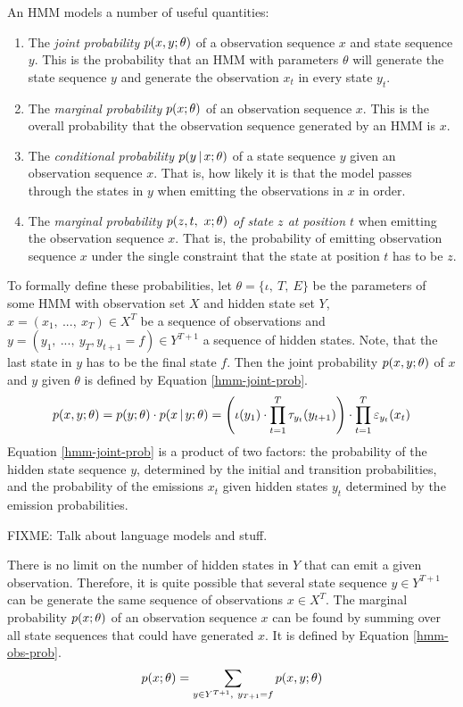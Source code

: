 An HMM models a number of useful quantities:
\begin{enumerate}
\item The {\it joint probability} $p(x,y\mbox{$ ; \, $}\theta)$ of a observation
  sequence $x$ and state sequence $y$. This is the probability that an
  HMM with parameters $\theta$ will generate the state sequence $y$
  and generate the observation $x_t$ in every state $y_t$.
\item The {\it marginal probability} $p(x\mbox{$ ; \, $} \theta)$ of an
  observation sequence $x$. This is the overall probability that the
  observation sequence generated by an HMM is $x$.
\item The {\it conditional probability} $p(y\mbox{$ \, | \, $} x\mbox{$ ; \, $}\theta)$ of a
  state sequence $y$ given an observation sequence $x$. That is, how
  likely it is that the model passes through the states in $y$ when
  emitting the observations in $x$ in order.
\item The {\it marginal probability $p(z, t,\ x\mbox{$ ; \, $} \theta)$ of
    state $z$ at position $t$} when emitting the observation sequence
  $x$. That is, the probability of emitting observation sequence $x$
  under the single constraint that the state at position $t$ has to be $z$.
\end{enumerate}

To formally define these probabilities, let $\theta = \{\iota,\ T,\
E\}$ be the parameters of some HMM with observation set $X$ and hidden
state set $Y$, $x = (x_1,\ ...,\ x_T) \in X^T$ be a sequence of
observations and $y = (y_1,\ ...,\ y_T, y_{t+1} = f) \in Y^{T+1}$ a sequence of
hidden states. Note, that the last state in $y$ has to be the final state
$f$. Then the joint probability $p(x,y\mbox{$ ; \, $}\theta)$ of $x$ and $y$
given $\theta$ is defined by Equation \eqref{hmm-joint-prob}.
\begin{equation}
p(x,y\mbox{$ ; \, $}\theta) = p(y\mbox{$ ; \, $}\theta)\cdot p(x \mbox{$ \, | \, $} y\mbox{$ ; \, $}\theta)= \Bigg(\iota(y_1) \cdot \prod_{t = 1}^{T} \tau_{y_t}(y_{t + 1})\Bigg) \cdot \prod_{t = 1}^T \varepsilon_{y_t}(x_t)\label{hmm-joint-prob}
\end{equation}
Equation \eqref{hmm-joint-prob} is a product of two factors: the
probability of the hidden state sequence $y$, determined by the
initial and transition probabilities, and the probability of the
emissions $x_t$ given hidden states $y_t$ determined by the emission
probabilities.

FIXME: Talk about language models and stuff.

There is no limit on the number of hidden states in $Y$ that can emit
a given observation. Therefore, it is quite possible that several
state sequence $y \in Y^{T+1}$ can be generate the same sequence of observations
$x \in X^T$. The marginal probability $p(x\mbox{$ ; \, $}\theta)$ of an observation
sequence $x$ can be found by summing over all state sequences that
could have generated $x$. It is defined by Equation
\eqref{hmm-obs-prob}.
\begin{equation}
p(x\parcond\theta) = \sum_{y \in Y^{T+1},\ y_{T+1} = f} p(x, y\parcond \theta)\label{hmm-obs-prob}
\end{equation}

